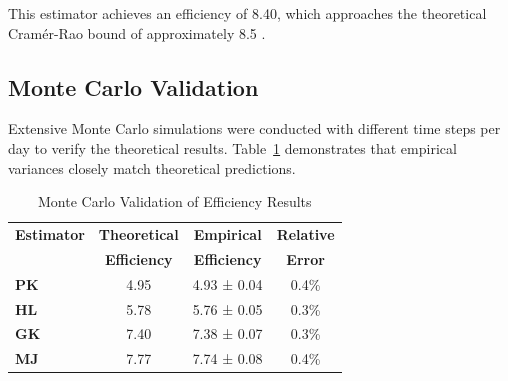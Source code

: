 This estimator achieves an efficiency of 8.40, which approaches the theoretical Cramér-Rao bound of approximately 8.5 \citet{meilijson2009GarmanKlassVolatilityEstimator}.




\subsection{Monte Carlo Validation}

Extensive Monte Carlo simulations were conducted with different time steps per day to verify the theoretical results. Table~\ref{tab:simulation_results} demonstrates that empirical variances closely match theoretical predictions.

\begin{table}[h]
\centering
\caption{Monte Carlo Validation of Efficiency Results}
\label{tab:simulation_results}
\begin{tabular}{lccc}
\hline
\textbf{Estimator} & \textbf{Theoretical} & \textbf{Empirical} & \textbf{Relative} \\
& \textbf{Efficiency} & \textbf{Efficiency} & \textbf{Error} \\
\hline
\textbf{PK} & 4.95 & 4.93 ± 0.04 & 0.4\% \\
\textbf{HL} & 5.78 & 5.76 ± 0.05 & 0.3\% \\
\textbf{GK} & 7.40 & 7.38 ± 0.07 & 0.3\% \\
\textbf{MJ} & 7.77 & 7.74 ± 0.08 & 0.4\% \\
\hline
\end{tabular}
\end{table}

